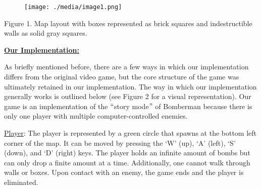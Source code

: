 \documentclass[12pt]{article}
\begin{document}
\vspace{\baselineskip}



\begin{figure}[H]
\advance\leftskip 0.0in		\texttt{[image: ./media/image1.png]}
\end{figure}



Figure 1. Map layout with boxes represented as brick squares and indestructible walls as solid gray squares.\par


\vspace{\baselineskip}

\vspace{\baselineskip}

\vspace{\baselineskip}

\vspace{\baselineskip}

\vspace{\baselineskip}

\vspace{\baselineskip}

\vspace{\baselineskip}
\textbf{\uline{Our Implementation:}}\par

As briefly mentioned before, there are a few ways in which our implementation differs from the original video game, but the core structure of the game was ultimately retained in our implementation. The way in which our implementation generally works is outlined below (see Figure 2 for a visual representation). Our game is an implementation of the $``$story mode$"$  of Bomberman because there is only one player with multiple computer-controlled enemies.\par


\vspace{\baselineskip}
\uline{Player}: The player is represented by a green circle that spawns at the bottom left corner of the map. It can be moved by pressing the ‘W’ (up), ‘A’ (left), ‘S’ (down), and ‘D’ (right) keys. The player holds an infinite amount of bombs but can only drop a finite amount at a time. Additionally, one cannot walk through walls or boxes. Upon contact with an enemy, the game ends and the player is eliminated.\par
\end{document}
